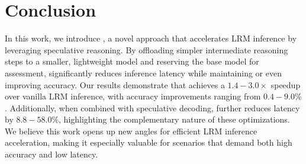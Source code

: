 \section{Conclusion}

In this work, we introduce \name{}, a novel approach that accelerates LRM inference by leveraging speculative reasoning. By offloading simpler intermediate reasoning steps to a smaller, lightweight model and reserving the base model for assessment, \name{} significantly reduces inference latency while maintaining or even improving accuracy. Our results demonstrate that \name{} achieves a $1.4-3.0\times$ speedup over vanilla LRM inference, with accuracy improvements ranging from $0.4-9.0\%$. Additionally, when combined with speculative decoding, \name{} further reduces latency by $8.8-58.0\%$, highlighting the complementary nature of these optimizations. We believe this work opens up new angles for efficient LRM inference acceleration, making it especially valuable for scenarios that demand both high accuracy and low latency.

